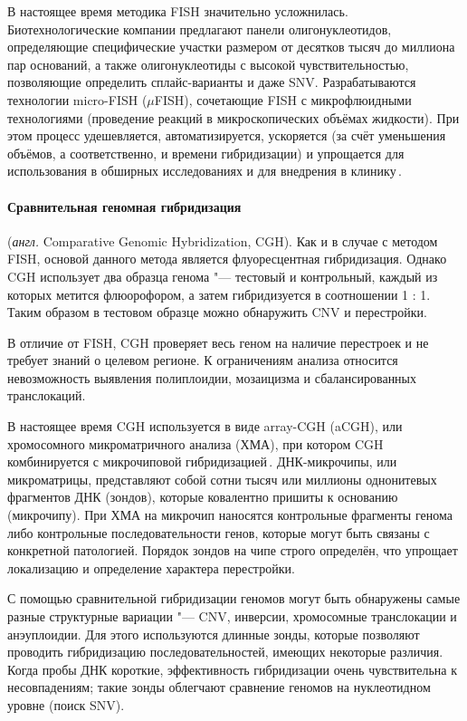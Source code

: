 \documentclass[a4paper,14pt]{extarticle}
\newcommand{\anglia}[1]{\textit{англ.} \textenglish{#1}}
\begin{document}
В настоящее время методика FISH значительно усложнилась.
Биотехнологические компании предлагают панели олигонуклеотидов, определяющие специфические участки размером от десятков тысяч до миллиона пар оснований, а также олигонуклеотиды с высокой чувствительностью, позволяющие определить сплайс-варианты и даже SNV.
Разрабатываются технологии micro-FISH ($\mu$FISH), сочетающие FISH с микрофлюидными технологиями (проведение реакций в микроскопических объёмах жидкости).
При этом процесс удешевляется, автоматизируется, ускоряется (за счёт уменьшения объёмов, а соответственно, и времени гибридизации) и упрощается для использования в обширных исследованиях и для внедрения в клинику\,\cite{Huber_2018}.

\paragraph{Сравнительная геномная гибридизация} (\anglia{Comparative Genomic Hybridization, CGH}).
Как и в случае с методом FISH, основой данного метода является флуоресцентная гибридизация.
Однако CGH использует два образца генома "--- тестовый и контрольный, каждый из которых метится флюорофором, а затем гибридизуется в соотношении 1 : 1.
Таким образом в тестовом образце можно обнаружить CNV и перестройки.

В отличие от FISH, CGH проверяет весь геном на наличие перестроек и не требует знаний о целевом регионе.
К ограничениям анализа относится невозможность выявления полиплоидии, мозаицизма и сбалансированных транслокаций.

В настоящее время CGH используется в виде array-CGH (aCGH), или хромосомного микроматричного анализа (ХМА), при котором CGH комбинируется с микрочиповой гибридизацией\,\cite{Theisen_2008}.
ДНК-микрочипы, или микроматрицы, представляют собой сотни тысяч или миллионы однонитевых фрагментов ДНК (зондов), которые ковалентно пришиты к основанию (микрочипу).
При ХМА на микрочип наносятся контрольные фрагменты генома либо контрольные последовательности генов, которые могут быть связаны с конкретной патологией.
Порядок зондов на чипе строго определён, что упрощает локализацию и определение характера перестройки.
    
С помощью сравнительной гибридизации геномов могут быть обнаружены самые разные структурные вариации "--- CNV, инверсии, хромосомные транслокации и анэуплоидии.
Для этого используются длинные зонды, которые позволяют проводить гибридизацию последовательностей, имеющих некоторые различия.
Когда пробы ДНК короткие, эффективность гибридизации очень чувствительна к несовпадениям; такие зонды облегчают сравнение геномов на нуклеотидном уровне (поиск SNV).
\end{document}
